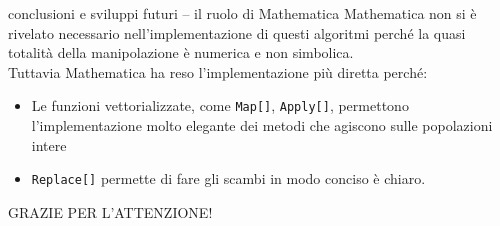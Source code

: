 \documentclass[10pt]{beamer}
\begin{document}
\begin{frame}{conclusioni e sviluppi futuri -- il ruolo di Mathematica}
	Mathematica \alert{non si è rivelato necessario} nell'implementazione di questi algoritmi perché la quasi totalità della manipolazione è numerica e non simbolica. \\
	Tuttavia Mathematica ha reso l'implementazione più diretta perché:
	\begin{itemize}
		\item Le funzioni vettorializzate, come \texttt{Map[]}, \texttt{Apply[]}, permettono l'implementazione molto elegante dei metodi che agiscono sulle popolazioni intere
		\item \texttt{Replace[]} permette di fare gli scambi in modo conciso è chiaro. 
	\end{itemize}
	
\end{frame}

\begin{frame}[standout]
	GRAZIE PER L'ATTENZIONE!
\end{frame}
\end{document}
